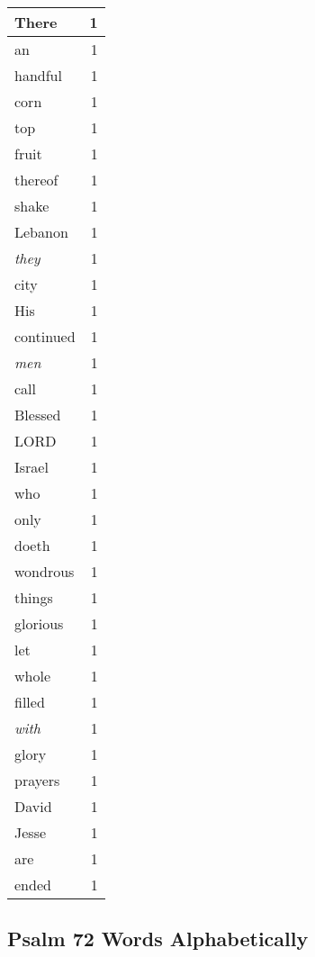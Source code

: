 \begin{center}
\begin{longtable}{l|r}
There & 1\\ \hline 
an & 1\\ \hline 
handful & 1\\ \hline 
corn & 1\\ \hline 
top & 1\\ \hline 
fruit & 1\\ \hline 
thereof & 1\\ \hline 
shake & 1\\ \hline 
Lebanon & 1\\ \hline 
\emph{they} & 1\\ \hline 
city & 1\\ \hline 
His & 1\\ \hline 
continued & 1\\ \hline 
\emph{men} & 1\\ \hline 
call & 1\\ \hline 
Blessed & 1\\ \hline 
LORD & 1\\ \hline 
Israel & 1\\ \hline 
who & 1\\ \hline 
only & 1\\ \hline 
doeth & 1\\ \hline 
wondrous & 1\\ \hline 
things & 1\\ \hline 
glorious & 1\\ \hline 
let & 1\\ \hline 
whole & 1\\ \hline 
filled & 1\\ \hline 
\emph{with} & 1\\ \hline 
glory & 1\\ \hline 
prayers & 1\\ \hline 
David & 1\\ \hline 
Jesse & 1\\ \hline 
are & 1\\ \hline 
ended & 1\\ \hline 
\end{longtable}
\end{center}





\subsection{Psalm 72 Words Alphabetically}


\normalsize
 
